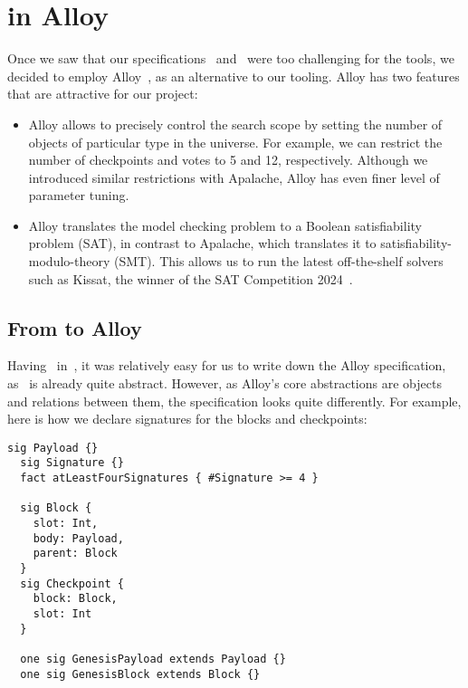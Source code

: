 
\section{\SpecThreeC{} in Alloy}\label{sec:alloy}

Once we saw that our specifications~\SpecThree{} and~\SpecFour{}
were too challenging for the \tlap{} tools, we decided to employ
Alloy~\cite{jackson2012software,alloytools}, as an alternative to our tooling.
Alloy has two features that are attractive for our project:

\begin{itemize}

  \item Alloy allows to precisely control the search scope by setting the
      number of objects of particular type in the universe. For example, we can
      restrict the number of checkpoints and votes to 5 and 12, respectively.
      Although we introduced similar restrictions with Apalache, Alloy has even
      finer level of parameter tuning.

  \item Alloy translates the model checking problem to a Boolean satisfiability
      problem (SAT), in contrast to Apalache, which translates it to satisfiability-modulo-theory (SMT).  This
      allows us to run the latest off-the-shelf solvers such as Kissat, the
      winner of the SAT Competition 2024~\cite{SAT-Competition-2024-solvers}.

\end{itemize}

\subsection{From \tlap{} to Alloy}

Having~\SpecThree{} in~\tlap{}, it was relatively easy for us to write down
the Alloy specification, as~\SpecThree{} is already quite abstract. However, as
Alloy's core abstractions are objects and relations between them, the
specification looks quite differently. For example, here is how we declare
signatures for the blocks and checkpoints:

\begin{lstlisting}[language=alloy,columns=fullflexible]
  sig Payload {}
  sig Signature {}
  fact atLeastFourSignatures { #Signature >= 4 }

  sig Block {
    slot: Int,
    body: Payload,
    parent: Block
  }
  sig Checkpoint {
    block: Block,
    slot: Int
  }

  one sig GenesisPayload extends Payload {}
  one sig GenesisBlock extends Block {}
\end{lstlisting}

